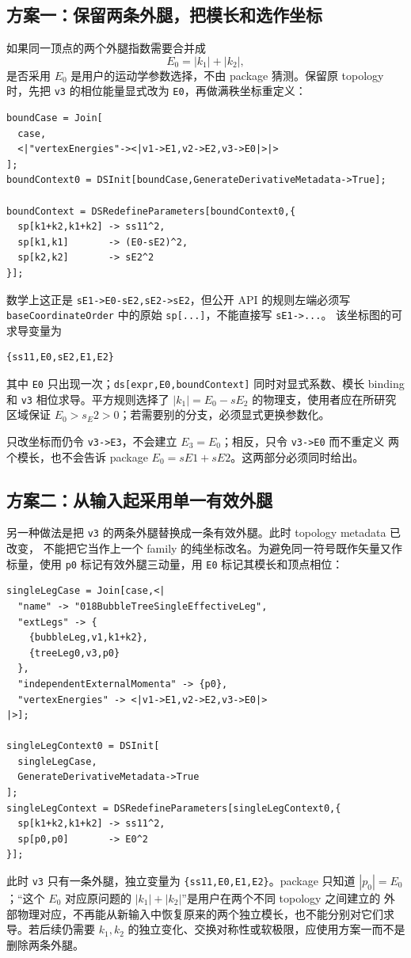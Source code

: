 ﻿\documentclass[a4paper,11pt]{article}
\begin{document}
\subsection{方案一：保留两条外腿，把模长和选作坐标}

如果同一顶点的两个外腿指数需要合并成
\begin{equation}
 E_0=|k_1|+|k_2|,
\end{equation}
是否采用 $E_0$ 是用户的运动学参数选择，不由 package 猜测。保留原 topology 时，先把
\texttt{v3} 的相位能量显式改为 \texttt{E0}，再做满秩坐标重定义：
\begin{verbatim}
boundCase = Join[
  case,
  <|"vertexEnergies"-><|v1->E1,v2->E2,v3->E0|>|>
];
boundContext0 = DSInit[boundCase,GenerateDerivativeMetadata->True];

boundContext = DSRedefineParameters[boundContext0,{
  sp[k1+k2,k1+k2] -> ss11^2,
  sp[k1,k1]       -> (E0-sE2)^2,
  sp[k2,k2]       -> sE2^2
}];
\end{verbatim}
数学上这正是 \texttt{sE1->E0-sE2,sE2->sE2}，但公开 API 的规则左端必须写
\texttt{baseCoordinateOrder} 中的原始 \texttt{sp[...]}，不能直接写 \texttt{sE1->...}。
该坐标图的可求导变量为
\begin{verbatim}
{ss11,E0,sE2,E1,E2}
\end{verbatim}
其中 \texttt{E0} 只出现一次；\texttt{ds[expr,E0,boundContext]} 同时对显式系数、模长 binding
和 \texttt{v3} 相位求导。平方规则选择了 $|k_1|=E_0-sE_2$ 的物理支，使用者应在所研究区域保证
$E_0>s_E2>0$；若需要别的分支，必须显式更换参数化。

只改坐标而仍令 \texttt{v3->E3}，不会建立 $E_3=E_0$；相反，只令 \texttt{v3->E0} 而不重定义
两个模长，也不会告诉 package $E_0=sE1+sE2$。这两部分必须同时给出。

\subsection{方案二：从输入起采用单一有效外腿}

另一种做法是把 \texttt{v3} 的两条外腿替换成一条有效外腿。此时 topology metadata 已改变，
不能把它当作上一个 family 的纯坐标改名。为避免同一符号既作矢量又作标量，使用 \texttt{p0}
标记有效外腿三动量，用 \texttt{E0} 标记其模长和顶点相位：
\begin{verbatim}
singleLegCase = Join[case,<|
  "name" -> "018BubbleTreeSingleEffectiveLeg",
  "extLegs" -> {
    {bubbleLeg,v1,k1+k2},
    {treeLeg0,v3,p0}
  },
  "independentExternalMomenta" -> {p0},
  "vertexEnergies" -> <|v1->E1,v2->E2,v3->E0|>
|>];

singleLegContext0 = DSInit[
  singleLegCase,
  GenerateDerivativeMetadata->True
];
singleLegContext = DSRedefineParameters[singleLegContext0,{
  sp[k1+k2,k1+k2] -> ss11^2,
  sp[p0,p0]       -> E0^2
}];
\end{verbatim}
此时 \texttt{v3} 只有一条外腿，独立变量为 \texttt{\{ss11,E0,E1,E2\}}。package 只知道
$|p_0|=E_0$；“这个 $E_0$ 对应原问题的 $|k_1|+|k_2|$”是用户在两个不同 topology 之间建立的
外部物理对应，不再能从新输入中恢复原来的两个独立模长，也不能分别对它们求导。若后续仍需要
$k_1,k_2$ 的独立变化、交换对称性或软极限，应使用方案一而不是删除两条外腿。
\end{document}
